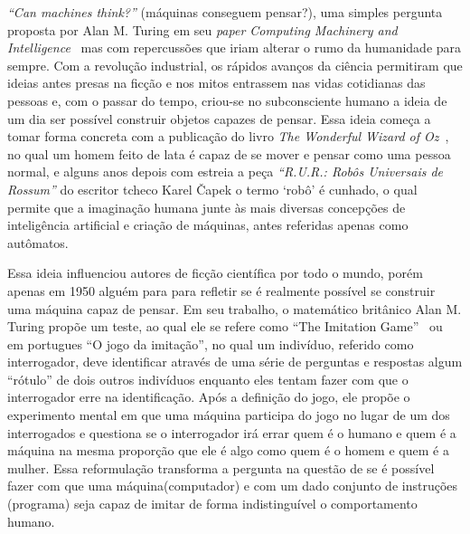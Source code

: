 

\label{cap:introducao}

\enlargethispage{.5\baselineskip}

\emph{“Can machines think?”} (máquinas conseguem pensar?), uma simples pergunta proposta por Alan M. Turing em seu \emph{paper Computing Machinery and Intelligence}~\citep{turing1950computing} mas com repercussões que iriam alterar o rumo da humanidade para sempre. Com a revolução industrial, os rápidos avanços da ciência permitiram que ideias antes presas na ficção e nos mitos entrassem nas vidas cotidianas das pessoas e, com o passar do tempo, criou-se no subconsciente humano a ideia de um dia ser possível construir objetos capazes de pensar. Essa ideia começa a tomar forma concreta com a publicação do livro \emph{The Wonderful Wizard of Oz}~\citep{Baum_Denslow_1996}, no qual um homem feito de lata é capaz de se mover e pensar como uma pessoa normal, e alguns anos depois com estreia a peça \emph{“R.U.R.: Robôs Universais de Rossum”} do escritor tcheco Karel Čapek o termo ‘robô’ é cunhado, o qual permite que a imaginação humana junte às mais diversas concepções de inteligência artificial e criação de máquinas, antes referidas apenas como autômatos.

Essa ideia influenciou autores de ficção científica por todo o mundo, porém apenas em 1950 alguém para para refletir se é realmente possível se construir uma máquina capaz de pensar. Em seu trabalho, o matemático britânico Alan M. Turing propõe um teste, ao qual ele se refere como “The Imitation Game”~\citep{turing1950computing} ou em portugues “O jogo da imitação”, no qual um indivíduo, referido como interrogador, deve identificar através de uma série de perguntas e respostas algum “rótulo” de dois outros indivíduos enquanto eles tentam fazer com que o interrogador erre na identificação. Após a definição do jogo, ele propõe o experimento mental em que uma máquina participa do jogo no lugar de um dos interrogados e questiona se o interrogador irá errar quem é o humano e quem é a máquina na mesma proporção que ele é algo como quem é o homem e quem é a mulher. Essa reformulação transforma a pergunta na questão de se é possível fazer com que uma máquina(computador) e com um dado conjunto de instruções (programa) seja capaz de imitar de forma indistinguível o comportamento humano.

